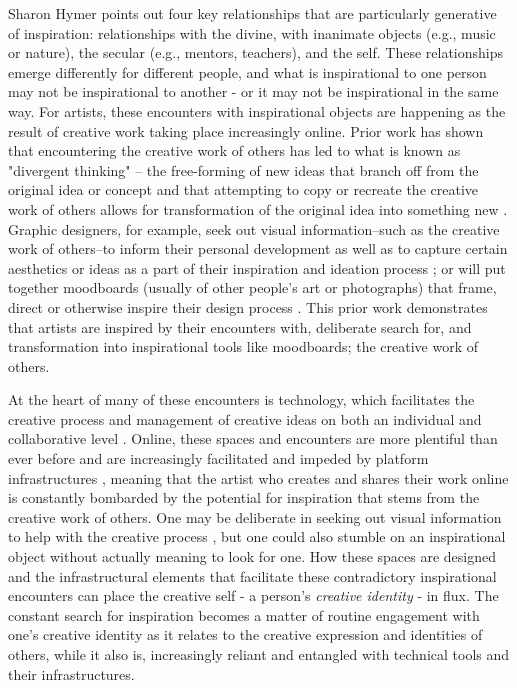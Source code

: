     Sharon Hymer \cite{hymer1990inspiration} points out four key relationships that are particularly generative of inspiration: relationships with the divine, with inanimate objects (e.g., music or nature), the secular (e.g., mentors, teachers), and the self. These relationships emerge differently for different people, and what is inspirational to one person may not be inspirational to another - or it may not be inspirational in the same way. For artists, these encounters with inspirational objects are happening as the result of creative work taking place increasingly online. Prior work has shown that encountering the creative work of others has led to what is known as "divergent thinking" -- the free-forming of new ideas that branch off from the original idea or concept \cite{GallagherIdeation2017} and that attempting to copy or recreate the creative work of others allows for transformation of the original idea into something new \cite{okada2017imitation}. Graphic designers, for example, seek out visual information--such as the creative work of others--to inform their personal development as well as to capture certain aesthetics or ideas as a part of their inspiration and ideation process \cite{laing2015study}; or will put together moodboards (usually of other people's art or photographs) that frame, direct or otherwise inspire their design process \cite{lucero2012framing}. This prior work demonstrates that artists are inspired by their encounters with, deliberate search for, and transformation into inspirational tools like moodboards; the creative work of others.\par

    At the heart of many of these encounters is technology, which facilitates the creative process and management of creative ideas on both an individual and collaborative level \cite{Rosselli2024Ideas}. Online, these spaces and encounters are more plentiful than ever before and are increasingly facilitated and impeded by platform infrastructures \cite{simpson2023rethinking,simpson2023captions,Rosselli2024Ideas}, meaning that the artist who creates and shares their work online is constantly bombarded by the potential for inspiration that stems from the creative work of others. One may be deliberate in seeking out visual information to help with the creative process \cite{laing2015study,hymer1990inspiration}, but one could also stumble on an inspirational object without actually meaning to look for one. How these spaces are designed and the infrastructural elements that facilitate these contradictory inspirational encounters can place the creative self - a person's \textit{creative identity} - in flux. The constant search for inspiration becomes a matter of routine engagement with one's creative identity as it relates to the creative expression and identities of others, while it also is, increasingly reliant and entangled with technical tools and their infrastructures. 

